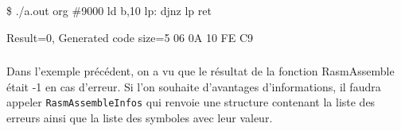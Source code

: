 
\begin{code}
\$ ./a.out
org \#9000
    ld b,10
lp: djnz lp
    ret

Result=0, Generated code size=5
06 0A 10 FE C9
\end{code}

\subsubsection{}
\begin{xfr}
Dans l'exemple précédent, on a vu que le résultat de la fonction RasmAssemble était -1 en cas d'erreur. Si l'on souhaite d'avantages d'informations, il faudra appeler \texttt{RasmAssembleInfos} qui renvoie une structure contenant la liste des erreurs ainsi que la liste des symboles avec leur valeur.


\end{xfr}
